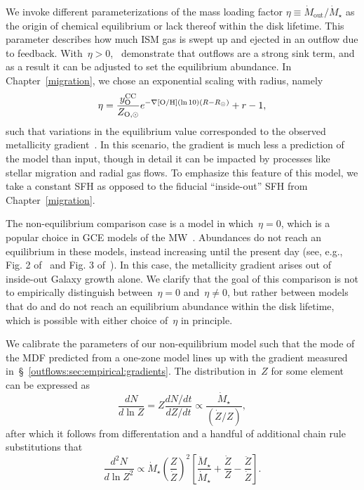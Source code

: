 We invoke different parameterizations of the mass loading factor
$\eta \equiv \dot{M}_\text{out} / \dot{M}_\star$ as the origin of chemical
equilibrium or lack thereof within the disk lifetime.
This parameter describes how much ISM gas is swept up and ejected in an outflow
due to feedback.
With~$\eta > 0$,~\citet{Weinberg2017b} demonstrate that outflows are a strong
sink term, and as a result it can be adjusted to set the equilibrium abundance.
In Chapter~\ref{migration}, we chose an exponential scaling with radius, namely
\begin{equation}
\eta = \frac{y_\text{O}^\text{CC}}{Z_{\text{O},\odot}}
e^{-\nabla\text{[O/H]} (\ln 10) (R - R_\odot)} + r - 1,
\end{equation}
such that variations in the equilibrium value corresponded to the observed
metallicity gradient~.
In this scenario, the gradient is much less a prediction of the model than
input, though in detail it can be impacted by processes like stellar migration
and radial gas flows.
To emphasize this feature of this model, we take a constant SFH as opposed to
the fiducial ``inside-out'' SFH from Chapter~\ref{migration}.
\par
The non-equilibrium comparison case is a model in which~$\eta = 0$, which is a
popular choice in GCE models of the MW~\citep[e.g.,][]{Minchev2013,
Minchev2014, Spitoni2019, Spitoni2021}.
Abundances do not reach an equilibrium in these models, instead increasing
until the present day (see, e.g., Fig. 2 of~\citealt{Minchev2013} and Fig. 3
of~\citealt{Spitoni2021}).
In this case, the metallicity gradient arises out of inside-out Galaxy growth
alone.
We clarify that the goal of this comparison is not to empirically distinguish
between~$\eta = 0$ and~$\eta \neq 0$, but rather between models that do and do
not reach an equilibrium abundance within the disk lifetime, which is possible
with either choice of~$\eta$ in principle.
\par
We calibrate the parameters of our non-equilibrium model such that the mode of
the MDF predicted from a one-zone model lines up with the gradient measured
in~\S~\ref{outflows:sec:empirical:gradients}.
The distribution in~$Z$ for some element can be expressed as
\begin{equation}
\frac{dN}{d \ln Z} = Z \frac{dN / dt}{dZ / dt}
\propto \frac{\dot{M}_\star}{(\dot{Z} / Z)},
\end{equation}
after which it follows from differentation and a handful of additional chain
rule substitutions that
\begin{equation}
\frac{d^2N}{d \ln Z^2} \propto \dot{M}_\star
\left(\frac{Z}{\dot{Z}}\right)^2
\left[
\frac{\ddot{M}_\star}{\dot{M}_\star} + \frac{\dot{Z}}{Z} -
\frac{\ddot{Z}}{\dot{Z}}
\right].
\label{outflows:eq:mdf-derivative}
\end{equation}
